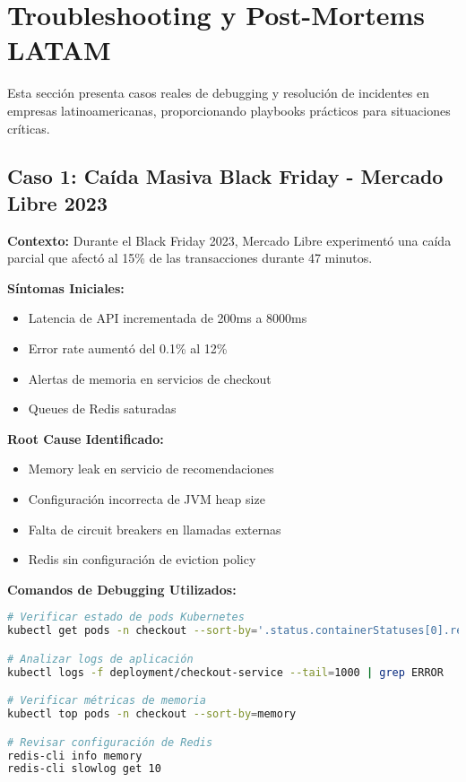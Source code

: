 \documentclass[12pt,a4paper]{article}
\begin{document}
\section{Troubleshooting y Post-Mortems LATAM}

Esta sección presenta casos reales de debugging y resolución de incidentes en empresas latinoamericanas, proporcionando playbooks prácticos para situaciones críticas.

\subsection{Caso 1: Caída Masiva Black Friday - Mercado Libre 2023}

\textbf{Contexto:} Durante el Black Friday 2023, Mercado Libre experimentó una caída parcial que afectó al 15\% de las transacciones durante 47 minutos.

\textbf{Síntomas Iniciales:}
\begin{itemize}
    \item Latencia de API incrementada de 200ms a 8000ms
    \item Error rate aumentó del 0.1\% al 12\%
    \item Alertas de memoria en servicios de checkout
    \item Queues de Redis saturadas
\end{itemize}

\textbf{Root Cause Identificado:}
\begin{itemize}
    \item Memory leak en servicio de recomendaciones
    \item Configuración incorrecta de JVM heap size
    \item Falta de circuit breakers en llamadas externas
    \item Redis sin configuración de eviction policy
\end{itemize}

\textbf{Comandos de Debugging Utilizados:}
\begin{lstlisting}[language=bash, caption=Investigación del incidente]
# Verificar estado de pods Kubernetes
kubectl get pods -n checkout --sort-by='.status.containerStatuses[0].restartCount'

# Analizar logs de aplicación
kubectl logs -f deployment/checkout-service --tail=1000 | grep ERROR

# Verificar métricas de memoria
kubectl top pods -n checkout --sort-by=memory

# Revisar configuración de Redis
redis-cli info memory
redis-cli slowlog get 10
\end{lstlisting}
\end{document}
